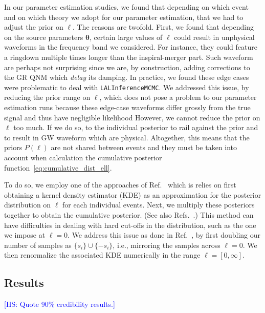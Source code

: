 \documentclass[twocolumn,
               prd,
               aps,
               superscriptaddress,
               tightenlines,
               nofootinbib,
               eqsecnum,
               amsfonts,
               amsmath,
               longbibliography]{revtex4-1}
\newcommand{\btheta}{\bm{\theta}}
\newcommand{\hs}[1]{{\textcolor{blue}{{[HS: #1]}} }}
\begin{document}
In our parameter estimation studies, we found that depending on which event and
on which theory we adopt for our parameter estimation, that we had to adjust
the prior on $\ell$.
%
The reasons are twofold. First, we found that depending on the source parameters $\btheta$,
certain large values of $\ell$ could result in unphysical waveforms in the frequency band we considered.
For instance, they could feature a ringdown multiple times longer than the inspiral-merger part.
%
Such waveform are perhaps not surprising since we are, by construction, adding corrections to the GR QNM
which \emph{delay} its damping.
%
%
In practice, we found these edge cases were problematic to deal with \texttt{LALInferenceMCMC}.
%
We addressed this issue, by reducing the prior range on $\ell$, which does not pose a problem to our parameter
estimation runs because these edge-case waveforms differ grossly from the true signal and thus have
negligible likelihood
%
However, we cannot reduce the prior on $\ell$ too much. If we do so,
to the individual posterior to rail against the prior and to result in GW
waveform which are physical.
%
Altogether, this means that the priors $P(\ell)$ are not shared between events and
they must be taken into account when calculation the cumulative posterior function~\eqref{eq:cumulative_dist_ell}.

To do so, we employ one of the approaches of Ref.~\cite{Perkins:2021mhb} which
is relies on first obtaining a kernel density estimator (KDE) as an approximation for
the posterior distribution on $\ell$ for each individual events. Next, we multiply
these posteriors together to obtain the cumulative posterior.
%
(See also Refs.~\cite{DelPozzo:2011pg,Cardenas-Avendano:2019zxd,Carullo:2021dui}.)
%
This method can have difficulties in dealing with hard cut-offs in the
distribution, such as the one we impose at $\ell = 0$. We address this issue as
done in Ref.~\cite{Perkins:2021mhb}, by first doubling our number of samples as
$\{ s_i \} \cup \{ - s_i \}$, i.e., mirroring the samples across $\ell = 0$.
%
We then renormalize the associated KDE numerically in the range $\ell = [0,
\infty]$.

\subsection{Results}

\hs{Quote 90\% credibility results.}



\end{document}
